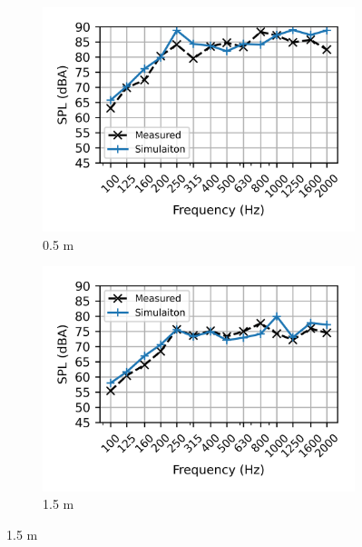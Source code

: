 \begin{figure}[H]
	\centering
	\begin{subfigure}[b]{0.49\textwidth}
		\centering
		\includegraphics{fig/chap5/initial_model/freq_spectrum/pos_10cm_0pt5m.png}
		\caption{0.5 m}
	\end{subfigure}
	\hfill
	\begin{subfigure}[b]{0.49\textwidth}
		\centering
		\includegraphics{fig/chap5/initial_model/freq_spectrum/pos_10cm_1pt5m.png}
		\caption{1.5 m}
	\end{subfigure}
\end{figure}

